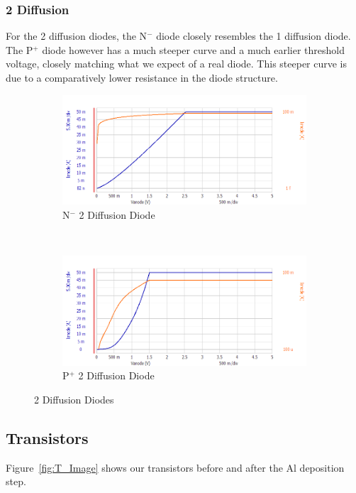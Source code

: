 \documentclass[letter,12pt]{article}
\begin{document}
		\subsubsection{2 Diffusion}
			\FloatBarrier
			For the 2 diffusion diodes, the N$^-$ diode closely resembles the 1 diffusion diode.  The P$^+$ diode however has a much steeper curve and a much earlier threshold voltage, closely matching what we expect of a real diode. This steeper curve is due to a comparatively lower resistance in the diode structure.
			\begin{figure}[]
				\centering
				\begin{subfigure}[b]{.45\textwidth}
					\includegraphics[width=\textwidth]{./Images/Probe_Test/D_Nwell_2diff.png}
					\caption{N$^-$ 2 Diffusion Diode}
				\end{subfigure}
				~
				\begin{subfigure}[b]{.45\textwidth}
					\includegraphics[width=\textwidth]{./Images/Probe_Test/D_Pwell_2diff.png}
					\caption{P$^+$ 2 Diffusion Diode}
				\end{subfigure}
				\caption{2 Diffusion Diodes}
				\label{fig:D_2diff}
			\end{figure}
	
	\FloatBarrier		
	\subsection{Transistors}\label{sec:Transistors}
		Figure~\ref{fig:T_Image} shows our transistors before and after the Al deposition step.
		
\end{document}
